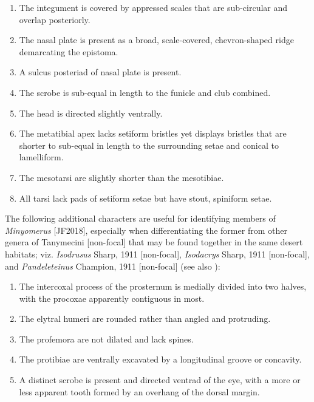 \documentclass[fleqn,10pt,lineno]{wlpeerj} %
\begin{document}
	\begin{enumerate}[itemsep=-0.4em]
		\item The integument is covered by appressed scales that are sub-circular and overlap posteriorly.
		\item The nasal plate is present as a broad, scale-covered, chevron-shaped ridge demarcating the epistoma.
		\item A sulcus posteriad of nasal plate is present.
		\item The scrobe is sub-equal in length to the funicle and club combined.
		\item The head is directed slightly ventrally.
		\item The metatibial apex lacks setiform bristles yet displays bristles that are shorter to sub-equal in length to the surrounding setae and conical to lamelliform.
		\item The mesotarsi are slightly shorter than the mesotibiae.
		\item All tarsi lack pads of setiform setae but have stout, spiniform setae.
	\end{enumerate}
	
	The following additional characters are useful for identifying members of \textit{Minyomerus} [JF2018], especially when differentiating the former from other genera of Tanymecini [non-focal] that may be found together in the same desert habitats; viz. \textit{Isodrusus} Sharp, 1911 [non-focal], \textit{Isodacrys} Sharp, 1911 [non-focal], and \textit{Pandeleteinus} Champion, 1911 [non-focal] (see also \citealt{anderson2002}):
	
	\begin{enumerate} [itemsep=-0.4em]
		\item The intercoxal process of the prosternum is medially divided into two halves, with the procoxae apparently contiguous in most.
		\item The elytral humeri are rounded rather than angled and protruding.
		\item The profemora are not dilated and lack spines.
		\item The protibiae are ventrally excavated by a longitudinal groove or concavity.
		\item A distinct scrobe is present and directed ventrad of the eye, with a more or less apparent tooth formed by an overhang of the dorsal margin.
	\end{enumerate}
	
\end{document}
